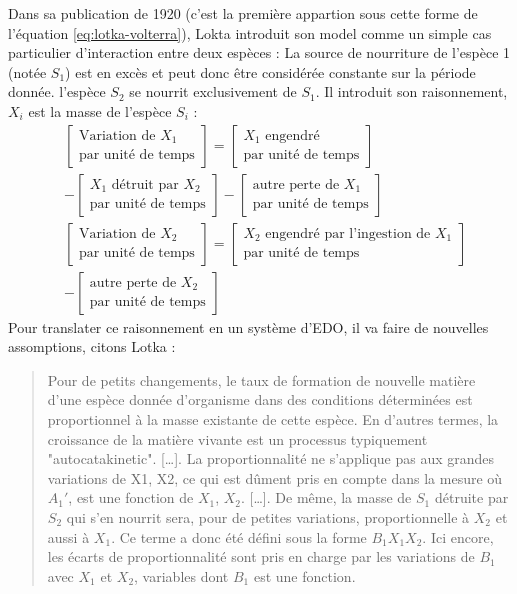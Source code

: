\documentclass{wsdcr}
\begin{document}
Dans sa publication de 1920 (c'est la première appartion sous cette forme de l'équation \ref{eq:lotka-volterra}), Lokta introduit son model comme un simple cas particulier d'interaction entre deux espèces : La source de nourriture de l'espèce 1 (notée $S_1$) est en excès et peut donc être considérée constante sur la période donnée. l'espèce $S_2$ se nourrit exclusivement de $S_1$.
Il introduit son raisonnement, $X_i$ est la masse de l'espèce $S_i$ :
\begin{equation}
\begin{aligned}
&\begin{bmatrix}
\text{Variation de }X_1 \\ \text{par unité de temps}
\end{bmatrix}
=
\begin{bmatrix}
X_1\text{ engendré}\\ \text{par unité de temps}
\end{bmatrix} \\
&- 
\begin{bmatrix}
X_1\text{ détruit par }X_2\\ \text{par unité de temps}
\end{bmatrix}
-
\begin{bmatrix}
\text{autre perte de }X_1\\ \text{par unité de temps}
\end{bmatrix} \\
&\begin{bmatrix}
\text{Variation de }X_2 \\ \text{par unité de temps}
\end{bmatrix}
=
\begin{bmatrix}
X_2\text{ engendré par l'ingestion de }X_1\\ \text{par unité de temps}
\end{bmatrix} \\
&-
\begin{bmatrix}
\text{autre perte de }X_2\\ \text{par unité de temps}
\end{bmatrix} 
\end{aligned}
\end{equation}
Pour translater ce raisonnement en un système d'EDO, il va faire de nouvelles assomptions, citons Lotka :
\begin{quotation}
Pour de petits changements, le taux de formation de nouvelle matière d'une espèce donnée d'organisme dans des conditions déterminées est proportionnel à la masse existante de cette espèce. En d'autres termes, la croissance de la matière vivante est un processus typiquement "autocatakinetic". […]. La proportionnalité ne s'applique pas aux grandes variations de X1, X2, ce qui est dûment pris en compte dans la mesure où $A_1'$, est une fonction de $X_1$, $X_2$. […]. De même, la masse de $S_1$ détruite par $S_2$ qui s'en nourrit sera, pour de petites variations, proportionnelle à $X_2$ et aussi à $X_1$. Ce terme a donc été défini sous la forme $B_1X_1X_2$. Ici encore, les écarts de proportionnalité sont pris en charge par les variations de $B_1$ avec $X_1$ et $X_2$, variables dont $B_1$ est une fonction.
\end{quotation}
\end{document}
